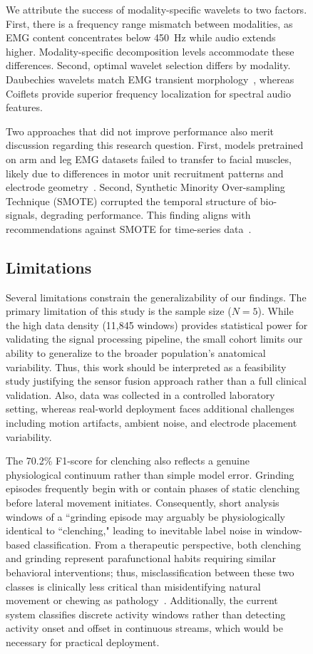 \documentclass[pdflatex,sn-vancouver-num, iicol]{sn-jnl}
\begin{document}
\begin{figure}[h]
We attribute the success of modality-specific wavelets to two factors. First, there is a frequency range mismatch between modalities, as EMG content concentrates below 450~Hz while audio extends higher. Modality-specific decomposition levels accommodate these differences. Second, optimal wavelet selection differs by modality. Daubechies wavelets match EMG transient morphology~\cite{englehart2003robust}, whereas Coiflets provide superior frequency localization for spectral audio features.

Two approaches that did not improve performance also merit discussion regarding this research question. First, models pretrained on arm and leg EMG datasets failed to transfer to facial muscles, likely due to differences in motor unit recruitment patterns and electrode geometry~\cite{jiang2012myoelectric}. Second, Synthetic Minority Over-sampling Technique (SMOTE) corrupted the temporal structure of bio-signals, degrading performance. This finding aligns with recommendations against SMOTE for time-series data~\cite{johnson2019survey}.

\subsection{Limitations}
Several limitations constrain the generalizability of our findings. The primary limitation of this study is the sample size ($N=5$). While the high data density (11,845 windows) provides statistical power for validating the signal processing pipeline, the small cohort limits our ability to generalize to the broader population's anatomical variability. Thus, this work should be interpreted as a feasibility study justifying the sensor fusion approach rather than a full clinical validation. Also, data was collected in a controlled laboratory setting, whereas real-world deployment faces additional challenges including motion artifacts, ambient noise, and electrode placement variability. 

The 70.2\% F1-score for clenching also reflects a genuine physiological continuum rather than simple model error. Grinding episodes frequently begin with or contain phases of static clenching before lateral movement initiates. Consequently, short analysis windows of a ``grinding episode may arguably be physiologically identical to ``clenching," leading to inevitable label noise in window-based classification. From a therapeutic perspective, both clenching and grinding represent parafunctional habits requiring similar behavioral interventions; thus, misclassification between these two classes is clinically less critical than misidentifying natural movement or chewing as pathology~\cite{lobbezoo2018international}. Additionally, the current system classifies discrete activity windows rather than detecting activity onset and offset in continuous streams, which would be necessary for practical deployment.


\end{figure}
\end{document}
